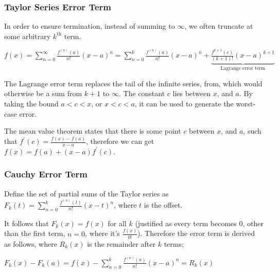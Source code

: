 \documentclass[a4paper, 12pt]{article}
\newcommand{\summation}[3]{\sum\limits_{#1}^{#2} #3}
\begin{document}
            \subsubsection*{Taylor Series Error Term}
                In order to ensure termination, instead of summing to $\infty$, we often truncate at some arbitrary $k^\text{th}$ term.
                \begin{center}
                    $f(x) = \summation{n = 0}{\infty}{\frac{f^{(n)}(a)}{n!}(x - a)^n} = \summation{n = 0}{k}{\frac{f^{(n)}(a)}{n!}(x - a)^n} + \underbrace{\textstyle\frac{f^{k + 1}(c)}{(k + 1)!}(x - a)^{k + 1}}_\text{Lagrange error term}$
                \end{center}
                The Lagrange error term replaces the tail of the infinite series, from, which would otherwise be a sum from $k + 1$ to $\infty$. The constant $c$ lies between $x$, and $a$. By taking the bound $a < c < x$, or $x < c < a$, it can be used to generate the worst-case error.
                \medskip

                The mean value theorem states that there is some point $c$ between $x$, and $a$, such that $f^\prime(c) = \frac{f(x) - f(a)}{x - a}$, therefore we can get $f(x) = f(a) + (x - a)f^\prime(c)$.
            \subsubsection*{Cauchy Error Term}
                Define the set of partial sums of the Taylor series as $F_k(t) = \summation{n = 0}{k}{\frac{f^{(n)}(t)}{n!}(x - t)^n}$, where $t$ is the offset.
                \smallskip

                It follows that $F_k(x) = f(x)$ for all $k$ (justified as every term becomes 0, other than the first term, $n = 0$, where it's $\frac{f(x)}{0!}$). Therefore the error term is derived as follows, where $R_k(x)$ is the remainder after $k$ terms;
                \begin{center}
                    $F_k(x) - F_k(a) = f(x) - \summation{n = 0}{k}{\frac{f^{(n)}(a)}{n!}(x - a)^n} = R_k(x)$
                \end{center}
\end{document}
